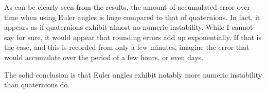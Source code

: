 \documentclass[a4paper]{article}
\begin{document}
As can be clearly seen from the results, the amount of accumulated error over time when using Euler angles is huge compared to that of quaternions. In fact, it appears as if quaternions exhibit almost no numeric instability. While I cannot say for sure, it would appear that rounding errors add up exponentially. If that is the case, and this is recorded from only a few minutes, imagine the error that would accumulate over the period of a few hours, or even days.

The solid conclusion is that Euler angles exhibit notably more numeric instability than quaternions do.
\end{document}
